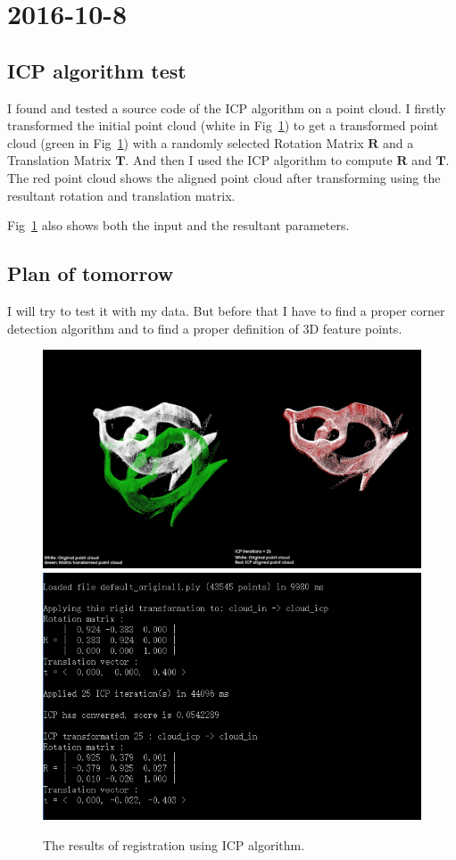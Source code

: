 \section{2016-10-8}
\subsection{ICP algorithm test}
I found and tested a source code of the ICP algorithm on a point cloud. I firstly transformed the initial point cloud (white in Fig~\ref{icp_fish}) to get a transformed point cloud (green in Fig~\ref{icp_fish}) with a randomly selected Rotation Matrix $\textbf{R}$ and a Translation Matrix $\textbf{T}$. And then I used the ICP algorithm to compute $\textbf{R}$ and $\textbf{T}$. The red point cloud shows the aligned point cloud after transforming using the resultant rotation and translation matrix.

Fig~\ref{icp_fish} also shows both the input and the resultant parameters. 

\subsection{Plan of tomorrow} I will try to test it with my data. But before that I have to find a proper corner detection algorithm and to find a proper definition of 3D feature points. 
\begin{figure}
	\label{icp_fish}
	\includegraphics[width=\textwidth]{figures/2016-10-8/icp_result_fish}
	\includegraphics[width=\textwidth]{figures/2016-10-8/icp_result}
	\caption{The results of registration using ICP algorithm.}
\end{figure}